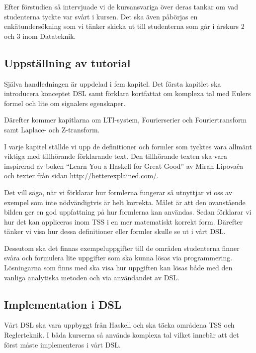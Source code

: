 \documentclass[]{article}
\begin{document}
Efter förstudien så intervjuade vi de kursansvariga över deras tankar om vad
studenterna tyckte var svårt i kursen. Det ska även påbörjas en enkätundersökning
som vi tänker skicka ut till studenterna som går i årskurs 2 och 3 inom Datateknik.


\subsection{Uppställning av tutorial}


Själva handledningen är uppdelad i fem kapitel. Det första kapitlet
ska introducera konceptet DSL samt förklara kortfattat om komplexa tal
med Eulers formel och lite om signalers egenskaper.

Därefter kommer kapitlarna om LTI-system, Fourierserier och Fouriertransform
samt Laplace- och Z-transform.

I varje kapitel ställde vi upp de definitioner och formler som tycktes
vara allmänt viktiga med tillhörande förklarande text. Den tillhörande
texten ska vara inspirerad av boken ``Learn You a Haskell for Great
Good'' av Miran Lipovača \cite{learnyouahaskell} och texter från sidan
\url{http://betterexplained.com/}.

Det vill säga, när vi förklarar hur formlerna fungerar så utnyttjar vi
oss av exempel som inte nödvändigtvis är helt korrekta. Målet är
att den ovanstående bilden ger en god uppfattning på hur formlerna kan användas.
Sedan förklarar vi hur det kan appliceras inom TSS i en mer matematiskt korrekt form.
Därefter tänker vi visa hur dessa definitioner eller formler skulle se ut i vårt DSL.

Dessutom ska det finnas exempeluppgifter till de områden studenterna finner
svåra och formulera lite uppgifter som ska kunna lösas via programmering.
Lösningarna som finns med ska visa hur uppgiften kan lösas både med den vanliga
analytiska metoden och via användandet av DSL.

\subsection{Implementation i DSL}

Vårt DSL ska vara uppbyggt från Haskell och ska täcka områdena TSS och Reglerteknik.
I båda kurserna så används komplexa tal vilket innebär att det först måste implementeras i vårt DSL.
\end{document}
